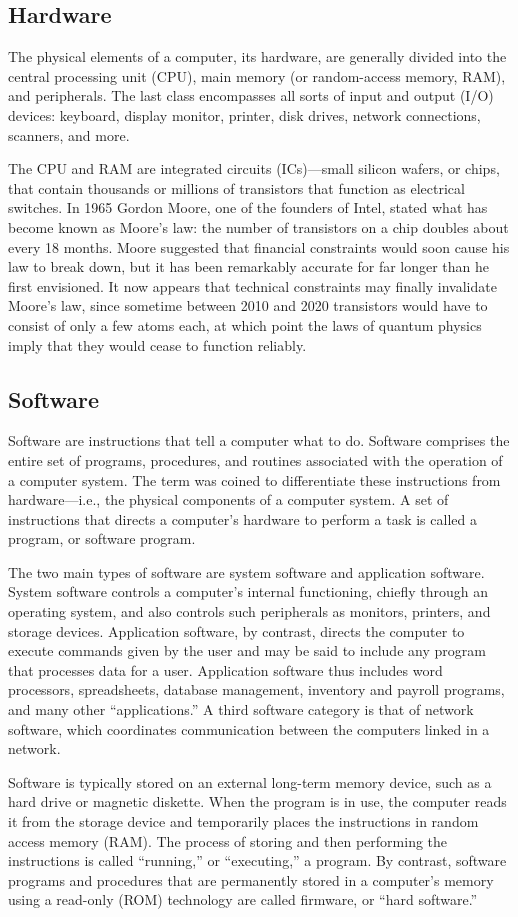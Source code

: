 \documentclass[11pt,a4paper,twoside]{article}
\begin{document}
\subsection{Hardware}
The physical elements of a computer, its hardware, are generally divided into the central processing unit (CPU), main memory (or random-access memory, RAM), and peripherals. The last class encompasses all sorts of input and output (I/O) devices: keyboard, display monitor, printer, disk drives, network connections, scanners, and more.\par
The CPU and RAM are integrated circuits (ICs)—small silicon wafers, or chips, that contain thousands or millions of transistors that function as electrical switches. In 1965 Gordon Moore, one of the founders of Intel, stated what has become known as Moore’s law: the number of transistors on a chip doubles about every 18 months. Moore suggested that financial constraints would soon cause his law to break down, but it has been remarkably accurate for far longer than he first envisioned. It now appears that technical constraints may finally invalidate Moore’s law, since sometime between 2010 and 2020 transistors would have to consist of only a few atoms each, at which point the laws of quantum physics imply that they would cease to function reliably. 
\subsection{Software}
Software are instructions that tell a computer what to do. Software comprises the entire set of programs, procedures, and routines associated with the operation of a computer system. The term was coined to differentiate these instructions from hardware—i.e., the physical components of a computer system. A set of instructions that directs a computer’s hardware to perform a task is called a program, or software program.\par
The two main types of software are system software and application software. System software controls a computer’s internal functioning, chiefly through an operating system, and also controls such peripherals as monitors, printers, and storage devices. Application software, by contrast, directs the computer to execute commands given by the user and may be said to include any program that processes data for a user. Application software thus includes word processors, spreadsheets, database management, inventory and payroll programs, and many other “applications.” A third software category is that of network software, which coordinates communication between the computers linked in a network.\par
Software is typically stored on an external long-term memory device, such as a hard drive or magnetic diskette. When the program is in use, the computer reads it from the storage device and temporarily places the instructions in random access memory (RAM). The process of storing and then performing the instructions is called “running,” or “executing,” a program. By contrast, software programs and procedures that are permanently stored in a computer’s memory using a read-only (ROM) technology are called firmware, or “hard software.”
\end{document}
